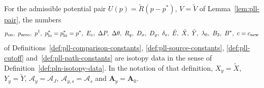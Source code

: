 \begin{lemma}\label{lem:pll-instance}
For the admissible potential pair $U(p)=\tilde R(p-p^*)$, $V=\tilde V$ of Lemma~\ref{lem:pll-pair}, the numbers
\[
 p_{\rm on},\ p_{\rm zero},\ p^\dagger,\ p^*_{\rm lo}=p^*_{\rm hi}=p^*,\ E_c,\ \Delta P,\ \Delta\theta,\ R_q,\ D_x,\ D_y,\
 \delta_s,\ \bar E,\ \bar X,\ \bar Y,\ \lambda_0,\ B_3,\ B^*,\ c=c_{\rm new}
\]
of Definitions~\ref{def:pll-comparison-constants}, \ref{def:pll-source-constants}, \ref{def:pll-cutoff}
and~\ref{def:pll-path-constants} are isotopy data in the sense of Definition~\ref{def:pln-isotopy-data}. In the
notation of that definition, $X_y=\tilde X$, $Y_y=\tilde Y$, $\mathcal A_y=\mathcal A_J$, $\mathcal A_{y,s}=\mathcal A_s$
and $\mathbf A_y=\mathbf A_0$.
\end{lemma}

